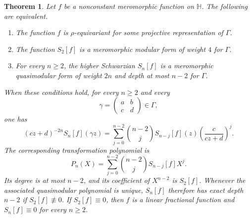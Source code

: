 \documentclass[11pt]{amsart}
\newtheorem{thm}{Theorem}[section]
\theoremstyle{definition}
\theoremstyle{remark}
\numberwithin{equation}{section}
\begin{document}
\begin{thm}\label{thm:transformation-law}
Let \(f\) be a nonconstant meromorphic function on \(\mathbb H\). The following are equivalent.
\begin{enumerate}
\item The function \(f\) is \(\rho\)-equivariant for some projective representation of \(\Gamma\).
\item The function \(S_2[f]\) is a meromorphic modular form of weight \(4\) for \(\Gamma\).
\item For every \(n\geq2\), the higher Schwarzian \(S_n[f]\) is a meromorphic quasimodular form of weight \(2n\) and depth at most \(n-2\) for \(\Gamma\).
\end{enumerate}
When these conditions hold, for every \(n\geq2\) and every
\[
\gamma=
\begin{pmatrix}
a&b\\
c&d
\end{pmatrix}
\in\Gamma,
\]
one has
\begin{equation}\label{eq:universal-transformation}
(cz+d)^{-2n}S_n[f](\gamma z)
=
\sum_{j=0}^{n-2}\binom{n-2}{j}S_{n-j}[f](z)
\left(\frac{c}{cz+d}\right)^j.
\end{equation}
The corresponding transformation polynomial is
\[
P_n(X)
=
\sum_{j=0}^{n-2}\binom{n-2}{j}S_{n-j}[f]X^j.
\]
Its degree is at most \(n-2\), and its coefficient of \(X^{n-2}\) is \(S_2[f]\). Whenever the associated quasimodular polynomial is unique, \(S_n[f]\) therefore has exact depth \(n-2\) if \(S_2[f]\not\equiv0\). If \(S_2[f]\equiv0\), then \(f\) is a linear fractional function and \(S_n[f]\equiv0\) for every \(n\geq2\).
\end{thm}
\end{document}
